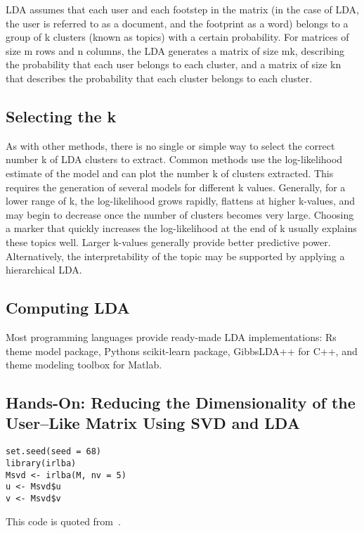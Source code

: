 LDA assumes that each user and each footstep in the matrix (in the
 case of LDA, the user is referred to as a document, and the 
footprint as a word) belongs to a group of k clusters (known as 
topics) with a certain probability. For matrices of size m rows and
 n columns, the LDA generates a matrix of size mk, describing the 
probability that each user belongs to each cluster, and a matrix of
 size kn that describes the probability that each cluster belongs 
to each cluster. 

\subsection{Selecting the k}

As with other methods, there is no single or simple way to select 
the correct number k of LDA clusters to extract. Common methods use
 the log-likelihood estimate of the model and can plot the number k
 of clusters extracted. This requires the generation of several 
models for different k values. Generally, for a lower range of k, 
the log-likelihood grows rapidly, flattens at higher k-values, and
 may begin to decrease once the number of clusters becomes very 
large. Choosing a marker that quickly increases the log-likelihood
 at the end of k usually explains these topics well. Larger 
k-values generally provide better predictive power. Alternatively,
 the interpretability of the topic may be supported by applying a 
hierarchical LDA.

\subsection{Computing LDA}

Most programming languages provide ready-made LDA implementations: Rs 
theme model package, Pythons scikit-learn package, 
GibbsLDA++ for C++, and theme modeling toolbox for Matlab.

\subsection{Hands-On: Reducing the Dimensionality of the
User–Like Matrix Using SVD and LDA}

\begin{verbatim}
set.seed(seed = 68)
library(irlba)
Msvd <- irlba(M, nv = 5)
u <- Msvd$u
v <- Msvd$v
\end{verbatim}

This code is quoted from~\cite{editor12}.

